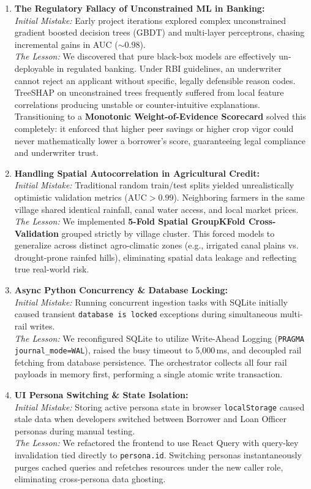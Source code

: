 \begin{enumerate}
  \item \textbf{The Regulatory Fallacy of Unconstrained ML in Banking:}\\
  \textit{Initial Mistake:} Early project iterations explored complex unconstrained gradient boosted decision trees (GBDT) and multi-layer perceptrons, chasing incremental gains in AUC ($\sim 0.98$).\\
  \textit{The Lesson:} We discovered that pure black-box models are effectively un-deployable in regulated banking. Under RBI guidelines, an underwriter cannot reject an applicant without specific, legally defensible reason codes. TreeSHAP on unconstrained trees frequently suffered from local feature correlations producing unstable or counter-intuitive explanations. Transitioning to a \textbf{Monotonic Weight-of-Evidence Scorecard} solved this completely: it enforced that higher peer savings or higher crop vigor could never mathematically lower a borrower's score, guaranteeing legal compliance and underwriter trust.

  \item \textbf{Handling Spatial Autocorrelation in Agricultural Credit:}\\
  \textit{Initial Mistake:} Traditional random train/test splits yielded unrealistically optimistic validation metrics ($\text{AUC} > 0.99$). Neighboring farmers in the same village shared identical rainfall, canal water access, and local market prices.\\
  \textit{The Lesson:} We implemented \textbf{5-Fold Spatial GroupKFold Cross-Validation} grouped strictly by village cluster. This forced models to generalize across distinct agro-climatic zones (e.g., irrigated canal plains vs. drought-prone rainfed hills), eliminating spatial data leakage and reflecting true real-world risk.

  \item \textbf{Async Python Concurrency \& Database Locking:}\\
  \textit{Initial Mistake:} Running concurrent ingestion tasks with SQLite initially caused transient \texttt{database is locked} exceptions during simultaneous multi-rail writes.\\
  \textit{The Lesson:} We reconfigured SQLite to utilize Write-Ahead Logging (\texttt{PRAGMA journal\_mode=WAL}), raised the busy timeout to 5,000\,ms, and decoupled rail fetching from database persistence. The orchestrator collects all four rail payloads in memory first, performing a single atomic write transaction.

  \item \textbf{UI Persona Switching \& State Isolation:}\\
  \textit{Initial Mistake:} Storing active persona state in browser \texttt{localStorage} caused stale data when developers switched between Borrower and Loan Officer personas during manual testing.\\
  \textit{The Lesson:} We refactored the frontend to use React Query with query-key invalidation tied directly to \texttt{persona.id}. Switching personas instantaneously purges cached queries and refetches resources under the new caller role, eliminating cross-persona data ghosting.
\end{enumerate}
